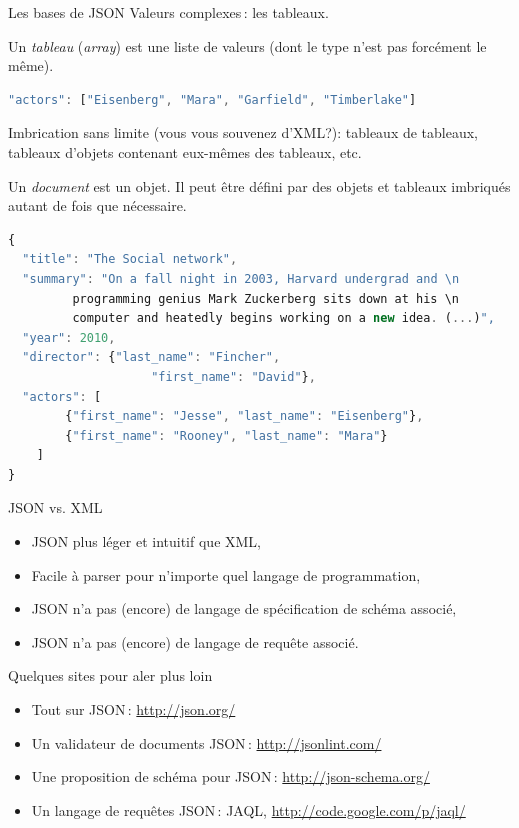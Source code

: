 \begin{frame}{Les bases de JSON}
Valeurs complexes\,: les \alert{tableaux}.

\bigskip

Un \textit{tableau} (\textit{array}) est une liste 
 de valeurs (dont le type n'est pas forcément le même).

\begin{lstlisting}[language=JavaScript,basicstyle=\small]
"actors": ["Eisenberg", "Mara", "Garfield", "Timberlake"]
\end{lstlisting}

\bigskip

Imbrication sans limite (vous vous souvenez d'XML?): tableaux de tableaux, tableaux d'objets contenant eux-mêmes des tableaux, etc.
\framebreak

Un \textit{document} est un objet. Il peut être défini par des objets et tableaux imbriqu\' es autant de fois que nécessaire.

\begin{lstlisting}[language=JavaScript,basicstyle=\small]
{
  "title": "The Social network", 
  "summary": "On a fall night in 2003, Harvard undergrad and \n
         programming genius Mark Zuckerberg sits down at his \n 
         computer and heatedly begins working on a new idea. (...)",
  "year": 2010, 
  "director": {"last_name": "Fincher",
                    "first_name": "David"},
  "actors": [ 
        {"first_name": "Jesse", "last_name": "Eisenberg"}, 
        {"first_name": "Rooney", "last_name": "Mara"}
    ]
}
\end{lstlisting}

\end{frame}


\begin{frame}{JSON vs. XML}
\begin{itemize}
\item JSON plus léger et intuitif que XML,
\item Facile à parser pour n'importe quel langage de programmation,
\item JSON n'a pas (encore) de langage de spécification de schéma associé,
\item JSON n'a pas (encore) de langage de requête associé. 
\end{itemize}
\end{frame}



\begin{frame}{Quelques sites pour aler plus loin}
\begin{itemize}
\item Tout sur JSON\,: \url{http://json.org/}
\item Un validateur de documents JSON\,: \url{http://jsonlint.com/}
\item Une proposition de \alert{schéma} pour JSON\,: \url{http://json-schema.org/}
\item Un langage de requêtes  JSON\,: JAQL, \url{http://code.google.com/p/jaql/}


\end{itemize}
\end{frame}


